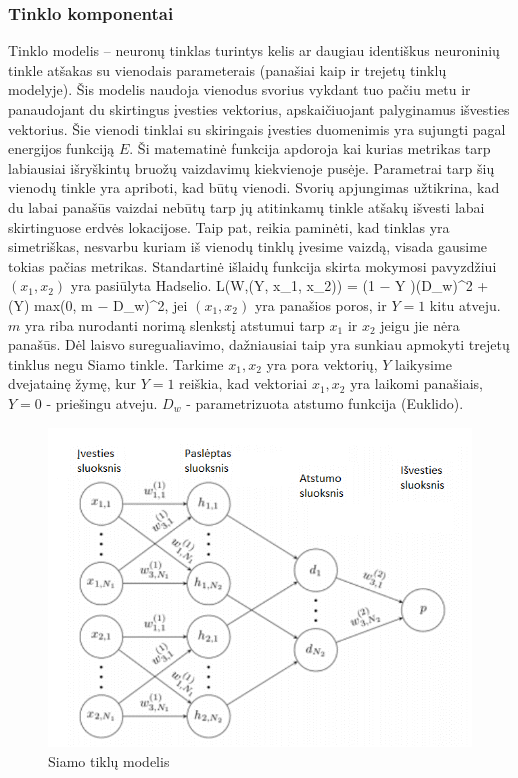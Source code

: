 \documentclass{VUMIFPSkursinis}
\let\[\relax \let\]\relax %
\DeclareRobustCommand{\[}{\begin{equation}}
\DeclareRobustCommand{\]}{\end{equation}}
\begin{document}
\subsubsection{Tinklo komponentai}
Tinklo modelis – neuronų tinklas turintys kelis ar daugiau identiškus neuroninių tinkle atšakas su vienodais parameterais \cite{Siamese_Network} (panašiai kaip ir trejetų tinklų modelyje). Šis modelis naudoja vienodus svorius vykdant tuo pačiu metu ir panaudojant du skirtingus įvesties vektorius, apskaičiuojant palyginamus išvesties vektorius. Šie vienodi tinklai su skiringais įvesties duomenimis yra sujungti pagal energijos funkciją $E$. Ši matematinė funkcija apdoroja kai kurias metrikas tarp labiausiai išryškintų bruožų vaizdavimų kiekvienoje pusėje.
Parametrai tarp šių vienodų tinkle yra apriboti, kad būtų vienodi. Svorių apjungimas užtikrina, kad du labai panašūs vaizdai nebūtų tarp jų atitinkamų tinkle  atšakų išvesti labai skirtinguose erdvės lokacijose. Taip pat, reikia paminėti, kad tinklas yra simetriškas, nesvarbu kuriam iš vienodų tinklų įvesime vaizdą, visada gausime tokias pačias metrikas.
Standartinė išlaidų funkcija skirta mokymosi pavyzdžiui $(x_1, x_2)$ yra pasiūlyta Hadselio. 
\[L(W,(Y, x_1, x_2)) =  (1 − Y )(D_w)^2 + (Y)  {max(0, m − D_w)}^2\], jei $(x_1, x_2)$  yra panašios poros, ir $Y = 1$ kitu atveju. $m$ yra riba nurodanti norimą slenkstį atstumui tarp $x_1$ ir $x_2$ jeigu jie nėra panašūs. Dėl laisvo suregualiavimo, dažniausiai taip yra sunkiau apmokyti trejetų tinklus negu Siamo tinkle. Tarkime $x_1, x_2$ yra pora vektorių, $Y$ laikysime dvejatainę žymę, kur $Y = 1$ reiškia, kad vektoriai $x_1, x_2$ yra laikomi panašiais, $Y = 0$ - priešingu atveju. $D_w$ - parametrizuota atstumo funkcija (Euklido).

\begin{figure}[H]
\centering
\includegraphics[scale=1.0]{img/Siamese}
\caption{Siamo tiklų modelis} %
\label{img:mlp}
\end{figure}
\end{document}
